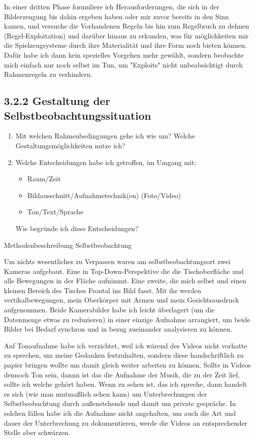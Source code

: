 \documentclass[11pt,a4paper,twoside]{scrreprt}
\begin{document}
In einer dritten Phase formuliere ich Herausforderungen, die sich in der Bilderzeugung bis dahin ergeben haben oder mir zuvor bereits in den Sinn kamen, und versuche die Vorhandenen Regeln bis hin zum Regelbruch zu dehnen (Regel-Exploitation) und darüber hinaus zu erkunden, was für möglichkeiten mir die Spielzeugsysteme durch ihre Materialität und ihre Form noch bieten können.
Dafür habe ich dann kein spezielles Vorgehen mehr gewählt, sondern beobachte mich einfach nur noch selbst im Tun, um "Exploits" nicht unbeabsichtigt durch Rahmenregeln zu verhindern.

		\subsection{3.2.2 Gestaltung der Selbstbeobachtungssituation}
		\begin{enumerate}
			\item Mit welchen Rahmenbedingungen gehe ich wie um?
    Welche Gestaltungsmöglichkeiten nutze ich?
    
			\item Welche Entscheidungen habe ich getroffen, im Umgang mit:
			\begin{itemize}
				\item Raum/Zeit
				\item Bildausschnitt/Aufnahmetechnik(en) (Foto/Video)
				\item Ton/Text/Sprache
			\end{itemize}
    			Wie begründe ich diese Entscheidungen?
    		\end{enumerate}

Methodenbeschreibung Selbstbeobachtung

Um nichts wesentliches zu Verpassen waren am selbstbeobachtungsort zwei Kameras aufgebaut. Eine in Top-Down-Perspektive die die Tischoberfläche und alle Bewegungen in der Fläche aufnimmt. Eine zweite, die mich selbst und einen kleinen Bereich des Tisches Frontal ins Bild fasst. Mit ihr werden vertikalbewegungen, mein Oberkörper mit Armen und mein Gesichtsausdruck aufgenommen. Beide Kamerabilder habe ich leicht überlagert (um die Datenmenge etwas zu reduzieren) in einer einzige Aufnahme arrangiert, um beide Bilder bei Bedarf synchron und in bezug zueinander analysieren zu können.

Auf Tonaufnahme habe ich verzichtet, weil ich wärend des Videos nicht vorhatte zu sprechen, um meine Gedanken festzuhalten, sondern diese handschriftlich zu papier bringen wollte um damit gleich weiter arbeiten zu können. Sollte in Videos dennoch Ton sein, dannn ist das die Aufnahme der Musik, die zu der Zeit lief, sollte ich welche gehört haben. Wenn zu sehen ist, das ich spreche, dann handelt es sich (wie man mutmaßlich sehen kann) um Unterbrechungen der Selbstbeobachtung durch außenstehende und damit um private gespräche. In solchen fällen habe ich die Aufnahme nicht angehalten, um auch die Art und dauer der Unterbrechung zu dokumentieren, werde die Videos an entsprechender Stelle aber schwärzen.
\end{document}
